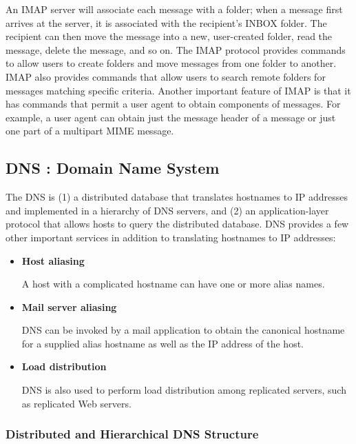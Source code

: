 \documentclass[11pt]{article}
\begin{document}
An IMAP server will associate each message with a folder; when a message first arrives at the server, it is associated with the recipient’s INBOX folder. The recipient can then move the message into a new, user-created folder, read the message, delete the message, and so on. The IMAP protocol provides commands to allow users to create folders and move messages from one folder to another. IMAP also provides commands that allow users to search remote folders for messages matching specific criteria. Another important feature of IMAP is that it has commands that permit a user agent to obtain components of messages. For example, a user agent can obtain just the message header of a message or just one part of a multipart MIME message.

\subsection{DNS : Domain Name System}

The DNS is (1) a distributed database that translates hostnames to IP addresses and implemented in a hierarchy of DNS servers, and (2) an application-layer protocol that allows hosts to query the distributed database. DNS provides a few other important services in addition to translating hostnames to IP addresses:

\begin{itemize}
	\item \textbf{Host aliasing}
	
	A host with a complicated hostname can have one or more alias names.
	
	\item \textbf{Mail server aliasing}
	
	DNS can be invoked by a mail application to obtain the canonical hostname for a supplied alias hostname as well as the IP address of the host.
	
	\item \textbf{Load distribution}
	
	DNS is also used to perform load distribution among replicated servers, such as replicated Web servers.
\end{itemize}

\subsubsection{Distributed and Hierarchical DNS Structure}
\end{document}
